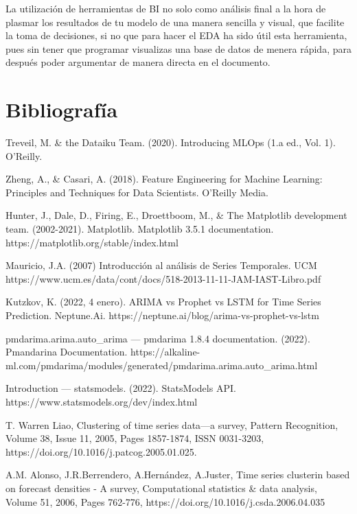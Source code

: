 \documentclass[11pt]{article}
\begin{document}
La utilización de herramientas de BI no solo como análisis final a la
hora de plasmar los resultados de tu modelo de una manera sencilla y
visual, que facilite la toma de decisiones, si no que para hacer el EDA
ha sido útil esta herramienta, pues sin tener que programar visualizas
una base de datos de menera rápida, para después poder argumentar de
manera directa en el documento.

    \hypertarget{bibliografuxeda}{%
\section{Bibliografía}\label{bibliografuxeda}}

    Treveil, M. \& the Dataiku Team. (2020). Introducing MLOps (1.a ed.,
Vol. 1). O'Reilly.

    Zheng, A., \& Casari, A. (2018). Feature Engineering for Machine
Learning: Principles and Techniques for Data Scientists. O'Reilly Media.

    Hunter, J., Dale, D., Firing, E., Droettboom, M., \& The Matplotlib
development team. (2002-2021). Matplotlib. Matplotlib 3.5.1
documentation. https://matplotlib.org/stable/index.html

    Mauricio, J.A. (2007) Introducción al análisis de Series Temporales. UCM
https://www.ucm.es/data/cont/docs/518-2013-11-11-JAM-IAST-Libro.pdf

    Kutzkov, K. (2022, 4 enero). ARIMA vs Prophet vs LSTM for Time Series
Prediction. Neptune.Ai. https://neptune.ai/blog/arima-vs-prophet-vs-lstm

    pmdarima.arima.auto\_arima --- pmdarima 1.8.4 documentation. (2022).
Pmandarina Documentation.
https://alkaline-ml.com/pmdarima/modules/generated/pmdarima.arima.auto\_arima.html

    Introduction --- statsmodels. (2022). StatsModels API.
https://www.statsmodels.org/dev/index.html

    T. Warren Liao, Clustering of time series data---a survey, Pattern
Recognition, Volume 38, Issue 11, 2005, Pages 1857-1874, ISSN 0031-3203,
https://doi.org/10.1016/j.patcog.2005.01.025.

    A.M. Alonso, J.R.Berrendero, A.Hernández, A.Juster, Time series
clusterin based on forecast densities - A survey, Computational
statistics \& data analysis, Volume 51, 2006, Pages 762-776,
https://doi.org/10.1016/j.csda.2006.04.035


    
    
    
\end{document}
